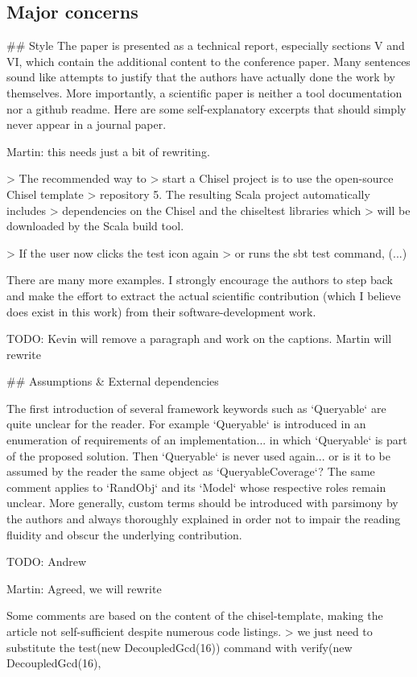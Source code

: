 \documentclass{article}
\newcommand{\todo}[1]{{\color{olive} TODO: #1}}
\newcommand{\martin}[1]{{\color{blue} Martin: #1\\}}
\begin{document}
\subsection*{Major concerns}
\#\# Style
The paper is presented as a technical report, especially sections V and VI, which contain the additional content to the conference paper.
Many sentences sound like attempts to justify that the authors have actually done the work by themselves. 
More importantly, a scientific paper is neither a tool documentation nor a github readme.
Here are some self-explanatory excerpts that should simply never appear in a journal paper.

\martin{this needs just a bit of rewriting.}

> The recommended way to
> start a Chisel project is to use the open-source Chisel template
> repository 5. The resulting Scala project automatically includes
> dependencies on the Chisel and the chiseltest libraries which
> will be downloaded by the Scala build tool.

> If the user now clicks the test icon again
> or runs the sbt test command, (...)

There are many more examples. 
I strongly encourage the authors to step back and make the effort to extract the actual scientific contribution (which I believe does exist in this work) from their software-development work.

\todo{Kevin will remove a paragraph and work on the captions. Martin will rewrite}


\#\# Assumptions \& External dependencies

The first introduction of several framework keywords such as `Queryable` are quite unclear for the reader.
For example `Queryable` is introduced in an enumeration of requirements of an implementation... in which `Queryable` is part of the proposed solution.
Then `Queryable` is never used again... or is it to be assumed by the reader the same object as `QueryableCoverage`?
The same comment applies to `RandObj` and its `Model` whose respective roles remain unclear.
More generally, custom terms should be introduced with parsimony by the authors and always thoroughly explained in order not to impair the reading fluidity and obscur the underlying contribution.

\todo{Andrew}

\martin{Agreed, we will rewrite}

Some comments are based on the content of the chisel-template, making the article not self-sufficient despite numerous code listings.
> we just need to substitute the test(new DecoupledGcd(16)) command with verify(new DecoupledGcd(16),
\end{document}

